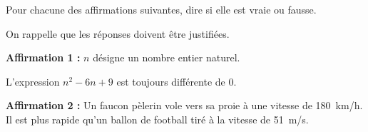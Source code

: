 
\medskip
 
Pour chacune des affirmations suivantes, dire si elle est vraie ou fausse.

On rappelle que les réponses doivent être justifiées.

\medskip

\textbf{Affirmation 1 :} $n$ désigne un nombre entier naturel.

L'expression $n^2 - 6n + 9$ est toujours différente de $0$.

\smallskip

\textbf{Affirmation 2 :} Un faucon pèlerin vole vers sa proie à une vitesse de 180~km/h. Il est
plus rapide qu'un ballon de football tiré à la vitesse de 51~m/s.
\vspace{0.25cm}

